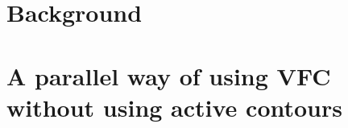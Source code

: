 \documentclass[11pt,a4paper,twoside,openright,titlepage]{book}
\begin{document}
\frontmatter



\cleardoublepage
\setcounter{page}{1}

\cleardoublepage
\setcounter{page}{1}
\tableofcontents

\mainmatter


\part{Background}


\part{A parallel way of using VFC without using active contours}




\backmatter

\listoffigures
\listoftables
\listoflistings
{}

\printbibliography[heading=bibintoc]
\end{document}
